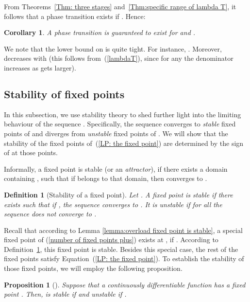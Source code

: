 \documentclass{IEEEtran}
\newtheorem{definition}{Definition}
\newtheorem{proposition}{Proposition}
\newtheorem{corollary}{Corollary}
\begin{document}
From Theorems~\ref{Thm: three stages} and~\ref{Thm:specific range of lambda T}, it follows that a phase transition exists if . Hence:
\begin{corollary}\label{R>=7}
A phase transition is guaranteed to exist for  and .
\end{corollary}
We note that the lower bound on  is quite tight. For instance, . Moreover,  decreases with  (this follows
from~(\ref{lambdaT}), since for any  the denominator increases as  gets larger).







\subsection{Stability of fixed points}
\label{Stability of Fixed point}
In this subsection, we use stability theory to shed further light into the limiting behaviour of the sequence .
Specifically, the sequence  converges to \emph{stable} fixed points of  and diverges from \emph{unstable} fixed points
of . We will show that the stability of the fixed points of~(\ref{LP: the fixed point}) are determined by the sign of  at
those points.

Informally, a fixed point  is stable (or an  \emph{attractor}),  if there exists a domain containing , such that if  belongs to
that domain, then  converges to .
\begin{definition}[Stability of a fixed point] \label{def: stable fixed point}
Let . A fixed point  is \textit{stable} if there exists  such that if , the
sequence  converges to .
It is \textit{unstable} if for all  the sequence  does not converge to .
\end{definition}

Recall that according to Lemma \ref{lemma:overload fixed point is stable}, a special fixed point of (\ref{number of fixed points plus}) exists at
, if . According to Definition~\ref{def: stable fixed point}, this fixed point is stable.
Besides this special case, the rest of the fixed points satisfy Equation~(\ref{LP: the fixed point}).
To establish the stability of those fixed points, we will employ the following proposition.
\begin{proposition}[{\cite{lynch2004dynamical}}]\label{prop: stable fixed point}
Suppose that a continuously differentiable function  has a fixed point . Then,  is stable if \mbox{} and
unstable if .
\end{proposition}
\end{document}
